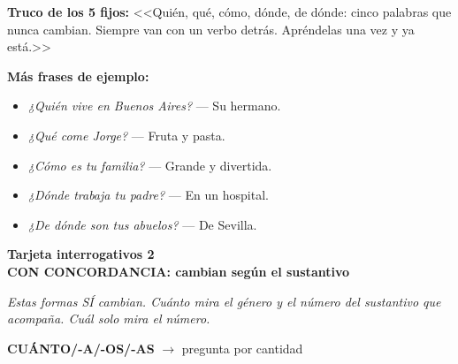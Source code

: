\documentclass[a4paper,10pt]{article}
\newcommand{\interrheader}[2]{%
  \noindent
  \colorbox{naranjainterr!90}{\parbox{\dimexpr\linewidth-2\fboxsep}{%
    \centering\color{white}\bfseries\large Tarjeta interrogativos #1\\[2pt]
    \normalsize #2%
  }}
  \vspace{4pt}
}
\begin{document}
\begin{trucointerr}
\textbf{Truco de los 5 fijos:} <<Quién, qué, cómo, dónde, de dónde: cinco palabras que nunca cambian. Siempre van con un verbo detrás. Apréndelas una vez y ya está.>>
\end{trucointerr}

\textbf{Más frases de ejemplo:}
\begin{itemize}[nosep, leftmargin=1.2em]
\item \textit{¿Quién vive en Buenos Aires?} --- Su hermano.
\item \textit{¿Qué come Jorge?} --- Fruta y pasta.
\item \textit{¿Cómo es tu familia?} --- Grande y divertida.
\item \textit{¿Dónde trabaja tu padre?} --- En un hospital.
\item \textit{¿De dónde son tus abuelos?} --- De Sevilla.
\end{itemize}

\newpage

\interrheader{2}{CON CONCORDANCIA: cambian según el sustantivo}

\vspace{4pt}
\small
\textit{Estas formas SÍ cambian. Cuánto mira el género y el número del sustantivo que acompaña. Cuál solo mira el número.}

\vspace{8pt}

\noindent\colorbox{naranjainterr!15}{\parbox{\dimexpr\linewidth-2\fboxsep}{\textbf{\large CUÁNTO/-A/-OS/-AS} $\to$ pregunta por cantidad}}

\vspace{4pt}
\end{document}
